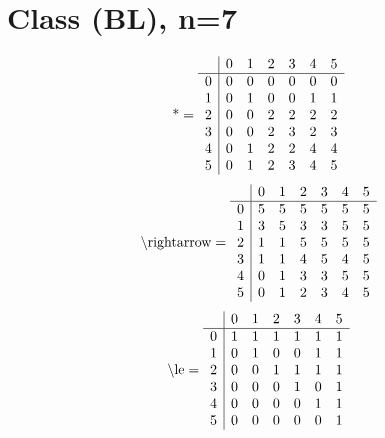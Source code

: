 \documentclass[11pt]{article}
\begin{document}
\section{Class (BL), n=7}
\[\text{*} = 
\begin{array}{r | r r r r r r}
 & 0 & 1 & 2 & 3 & 4 & 5 \\ \hline
0 & 0 & 0 & 0 & 0 & 0 & 0 \\
1 & 0 & 1 & 0 & 0 & 1 & 1 \\
2 & 0 & 0 & 2 & 2 & 2 & 2 \\
3 & 0 & 0 & 2 & 3 & 2 & 3 \\
4 & 0 & 1 & 2 & 2 & 4 & 4 \\
5 & 0 & 1 & 2 & 3 & 4 & 5 \\
\end{array}
\]
\[\text{\textbackslash rightarrow} = 
\begin{array}{r | r r r r r r}
 & 0 & 1 & 2 & 3 & 4 & 5 \\ \hline
0 & 5 & 5 & 5 & 5 & 5 & 5 \\
1 & 3 & 5 & 3 & 3 & 5 & 5 \\
2 & 1 & 1 & 5 & 5 & 5 & 5 \\
3 & 1 & 1 & 4 & 5 & 4 & 5 \\
4 & 0 & 1 & 3 & 3 & 5 & 5 \\
5 & 0 & 1 & 2 & 3 & 4 & 5 \\
\end{array}
\]
\[\text{\textbackslash le} = 
\begin{array}{r | r r r r r r}
 & 0 & 1 & 2 & 3 & 4 & 5 \\ \hline
0 & 1 & 1 & 1 & 1 & 1 & 1 \\
1 & 0 & 1 & 0 & 0 & 1 & 1 \\
2 & 0 & 0 & 1 & 1 & 1 & 1 \\
3 & 0 & 0 & 0 & 1 & 0 & 1 \\
4 & 0 & 0 & 0 & 0 & 1 & 1 \\
5 & 0 & 0 & 0 & 0 & 0 & 1 \\
\end{array}
\]
\end{document}
